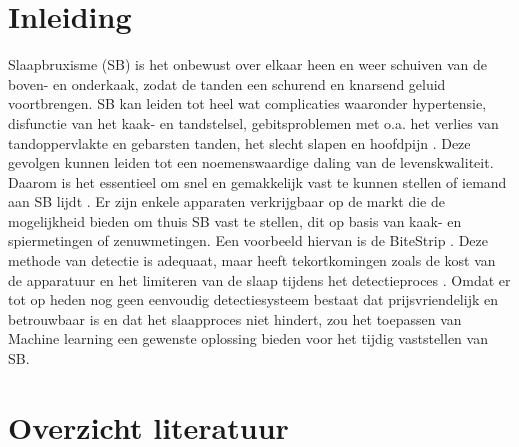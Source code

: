\documentclass{hogent-article}
\affiliation{
  \textsuperscript{1} \href{mailto:brent.decorte@student.hogent.be}{brent.decorte@student.hogent.be}}
\begin{document}
\flushbottom %
\maketitle %
\tableofcontents %
\thispagestyle{empty} %


\section{Inleiding}

Slaapbruxisme (SB) is het onbewust over elkaar heen en weer  schuiven van de boven- en onderkaak, zodat de tanden een schurend en knarsend geluid voortbrengen. SB kan leiden tot heel wat complicaties waaronder hypertensie, disfunctie van het kaak- en tandstelsel, gebitsproblemen met o.a. het verlies van tandoppervlakte en gebarsten tanden, het slecht slapen en hoofdpijn . Deze gevolgen kunnen leiden tot een noemenswaardige daling van de levenskwaliteit.  Daarom is het essentieel om snel en gemakkelijk vast te kunnen stellen of  iemand  aan  SB lijdt .
\bigbreak
Er zijn enkele apparaten verkrijgbaar op de markt die  de mogelijkheid bieden om thuis SB vast te stellen, dit op basis van kaak- en spiermetingen of zenuwmetingen. Een voorbeeld hiervan is de BiteStrip \cite{Shochat_2007}.  Deze methode van detectie is adequaat, maar heeft tekortkomingen zoals de kost van de apparatuur en het limiteren van de slaap tijdens het detectieproces . 
\bigbreak
Omdat er tot op heden nog geen eenvoudig detectiesysteem bestaat dat prijsvriendelijk en betrouwbaar is en  dat het slaapproces niet hindert, zou het toepassen van Machine learning een gewenste oplossing bieden voor het tijdig vaststellen van SB.








\section{Overzicht literatuur}
\end{document}
